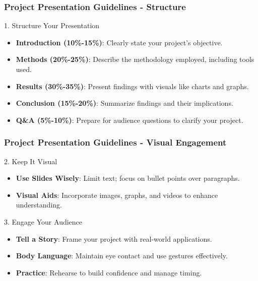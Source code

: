 \documentclass[aspectratio=169]{beamer}
\begin{document}
\begin{frame}[fragile]
    \frametitle{Project Presentation Guidelines - Structure}
    \begin{block}{1. Structure Your Presentation}
        \begin{itemize}
            \item \textbf{Introduction (10\%-15\%)}: Clearly state your project's objective.
            \item \textbf{Methods (20\%-25\%)}: Describe the methodology employed, including tools used.
            \item \textbf{Results (30\%-35\%)}: Present findings with visuals like charts and graphs.
            \item \textbf{Conclusion (15\%-20\%)}: Summarize findings and their implications.
            \item \textbf{Q\&A (5\%-10\%)}: Prepare for audience questions to clarify your project.
        \end{itemize}
    \end{block}
\end{frame}

\begin{frame}[fragile]
    \frametitle{Project Presentation Guidelines - Visual Engagement}
    \begin{block}{2. Keep It Visual}
        \begin{itemize}
            \item \textbf{Use Slides Wisely}: Limit text; focus on bullet points over paragraphs.
            \item \textbf{Visual Aids}: Incorporate images, graphs, and videos to enhance understanding.
        \end{itemize}
    \end{block}

    \begin{block}{3. Engage Your Audience}
        \begin{itemize}
            \item \textbf{Tell a Story}: Frame your project with real-world applications.
            \item \textbf{Body Language}: Maintain eye contact and use gestures effectively.
            \item \textbf{Practice}: Rehearse to build confidence and manage timing.
        \end{itemize}
    \end{block}
\end{frame}
\end{document}
